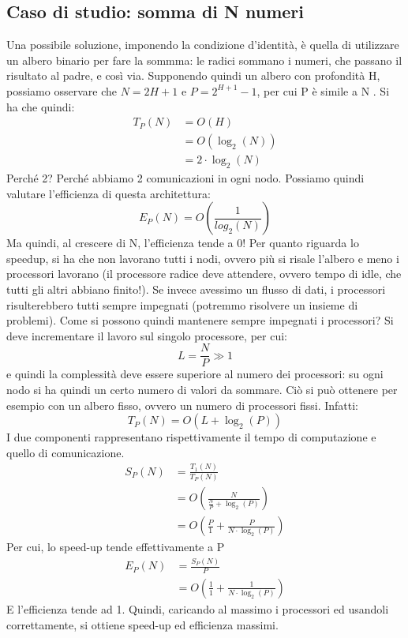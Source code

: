 \subsection{Caso di studio: somma di N numeri}
Una possibile soluzione, imponendo la condizione d'identità, è quella di utilizzare un albero binario per fare la
sommma: le radici sommano i numeri, che passano il risultato al padre, e così via. Supponendo quindi un albero con
profondità H, possiamo osservare che $N = 2{H+1}$ e $P = 2^{H+1} - 1$, per cui P è simile a N . Si ha che quindi:
\begin{align}
T_P(N) &= O \left(H \right)              \nonumber \\
       &= O \left(\log_2(N)\right)      \nonumber \\
       &= 2 \cdot \log_2 \left(N\right)
\end{align}
Perché 2? Perché abbiamo 2 comunicazioni in ogni nodo. Possiamo quindi valutare l'efficienza di questa architettura:
\begin{equation}
 E_P \left( N \right) = O \left( \frac{1}{log_2\left(N\right)} \right)
\end{equation}
Ma quindi, al crescere di N, l'efficienza tende a 0! Per quanto riguarda lo speedup, si ha che non lavorano tutti i
nodi, ovvero più si risale l'albero e meno i processori lavorano (il processore radice deve attendere, ovvero tempo
di idle, che tutti gli altri abbiano finito!). Se invece avessimo un flusso di dati, i processori risulterebbero
tutti sempre impegnati (potremmo risolvere un insieme di problemi).
Come si possono quindi mantenere sempre impegnati i processori? Si deve incrementare il lavoro sul singolo processore,
per cui:
\begin{equation}
 L = \frac{N}{P} \gg 1
\end{equation}
e quindi la complessità deve essere superiore al numero dei processori: su ogni nodo si ha quindi un certo numero di
valori da sommare. Ciò si può ottenere per esempio con un albero fisso, ovvero un numero di processori fissi. Infatti:
\begin{equation}
 T_P\left(N\right) = O \left(L + \log_2 \left(P\right)\right)
\end{equation}
I due componenti rappresentano rispettivamente il tempo di computazione e quello di comunicazione.
\begin{align}
 S_P(N) &= \frac{T_1(N)}{T_P(N)} \nonumber \\
        &= O \left( \frac{N}{\frac{N}{P} + \log_2(P)} \right) \nonumber \\
        &= O \left( \frac{P}{1} + \frac{P}{N \cdot \log_2(P)} \right)
\end{align}
Per cui, lo speed-up tende effettivamente a P
\begin{align}
 E_P(N) &= \frac{S_P(N)}{P} \nonumber \\
        &= O \left(\frac{1}{1} + \frac{1}{N \cdot \log_2(P)}\right)
\end{align}
E l'efficienza tende ad 1. Quindi, caricando al massimo i processori ed usandoli correttamente, si ottiene speed-up
ed efficienza massimi.
